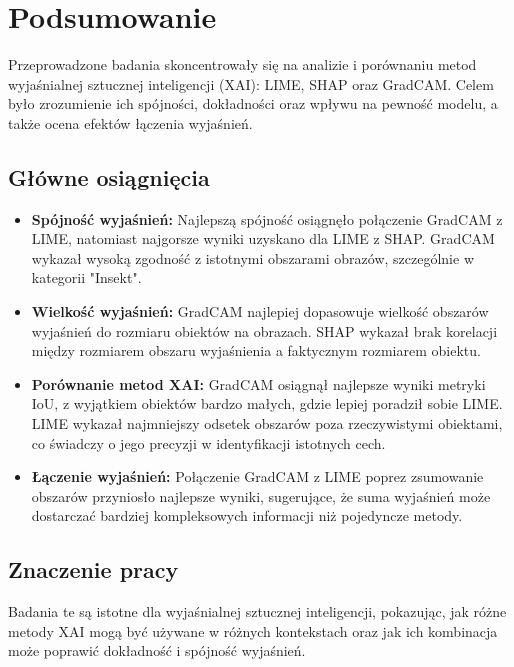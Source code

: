 
\chapter*{Podsumowanie}


Przeprowadzone badania skoncentrowały się na analizie i porównaniu metod wyjaśnialnej sztucznej inteligencji (XAI): LIME, SHAP oraz GradCAM. Celem było zrozumienie ich spójności, dokładności oraz wpływu na pewność modelu, a także ocena efektów łączenia wyjaśnień.

\section*{Główne osiągnięcia}

\begin{itemize}
    \item \textbf{Spójność wyjaśnień:} Najlepszą spójność osiągnęło połączenie GradCAM z LIME, natomiast najgorsze wyniki uzyskano dla LIME z SHAP. GradCAM wykazał wysoką zgodność z istotnymi obszarami obrazów, szczególnie w kategorii "Insekt".
    
    \item \textbf{Wielkość wyjaśnień:} GradCAM najlepiej dopasowuje wielkość obszarów wyjaśnień do rozmiaru obiektów na obrazach. SHAP wykazał brak korelacji między rozmiarem obszaru wyjaśnienia a faktycznym rozmiarem obiektu.
    
    \item \textbf{Porównanie metod XAI:} GradCAM osiągnął najlepsze wyniki metryki IoU, z wyjątkiem obiektów bardzo małych, gdzie lepiej poradził sobie LIME. LIME wykazał najmniejszy odsetek obszarów poza rzeczywistymi obiektami, co świadczy o jego precyzji w identyfikacji istotnych cech.
    
    \item \textbf{Łączenie wyjaśnień:} Połączenie GradCAM z LIME poprez zsumowanie obszarów przyniosło najlepsze wyniki, sugerujące, że suma wyjaśnień może dostarczać bardziej kompleksowych informacji niż pojedyncze metody.
\end{itemize}

\section*{Znaczenie pracy}

Badania te są istotne dla wyjaśnialnej sztucznej inteligencji, pokazując, jak różne metody XAI mogą być używane w różnych kontekstach oraz jak ich kombinacja może poprawić dokładność i spójność wyjaśnień.

